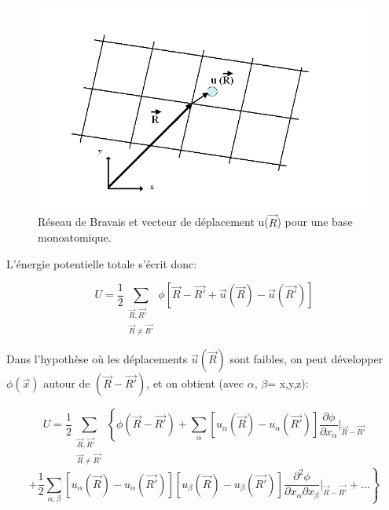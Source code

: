 \documentclass[12pt,a4paper]{book}
\begin{document}
\begin{figure}
	\centering
\includegraphics[scale=0.8]{reseauB}
\caption[Reseau de Bravais et veteur de déplacement pour une base monoatomique]{Réseau de Bravais et vecteur de déplacement u($\overrightarrow{R}$) pour une base monoatomique.}	
\end{figure}


L'énergie potentielle totale s'écrit donc:

\begin{equation}
U = \frac{1}{2} \sum_{\substack{\overrightarrow{R},\overrightarrow{R'}\\ \overrightarrow{R}\neq \overrightarrow{R'}}} \phi [\overrightarrow{R} - \overrightarrow{R'} + \overrightarrow{u}(\overrightarrow{R})- \overrightarrow{u}(\overrightarrow{R'})]
\end{equation}

Dans l'hypothèse où les déplacements $\overrightarrow{u}(\overrightarrow{R})$ sont faibles, on peut développer $\phi(\overrightarrow{x})$ autour de $(\overrightarrow{R}-\overrightarrow{R'})$, et on obtient (avec $\alpha$, $\beta$= x,y,z):

\begin{equation*}
U = \frac{1}{2}\sum_{\substack{\overrightarrow{R},\overrightarrow{R'}\\ \overrightarrow{R}\neq \overrightarrow{R'}}} \left\{\phi(\overrightarrow{R}-\overrightarrow{R'}) + \sum_{\alpha} [u_{\alpha}(\overrightarrow{R})- u_{\alpha}(\overrightarrow{R'})] \frac{\partial\phi}{\partial x_{\alpha}}\Big|_{\overrightarrow{R}-\overrightarrow{R'}}\right.
\end{equation*}
\begin{equation}
\left.+\frac{1}{2} \sum_{\alpha,\beta}[u_{\alpha}(\overrightarrow{R})-u_{\alpha}(\overrightarrow{R'})][u_{\beta}(\overrightarrow{R})-u_{\beta}(\overrightarrow{R'})] \frac{\partial^{2}\phi}{\partial x_{\alpha} \partial x_{\beta}}\Big|_{\overrightarrow{R}-\overrightarrow{R'}} + \ldots\right\} \label{equation1}
\end{equation}
\end{document}
